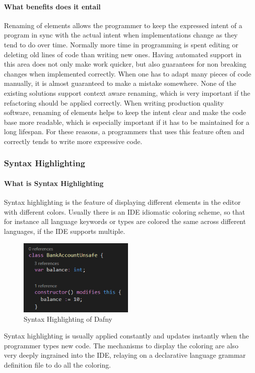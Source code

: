 \paragraph{What benefits does it entail}
Renaming of elements allows the programmer to keep the expressed intent of a program in sync with the actual intent when implementations change as they tend to do over time. Normally more time in programming is spent editing or deleting old lines of code than writing new ones. Having automated support in this area does not only make work quicker, but also guarantees for non breaking changes when implemented correctly. When one has to adapt many pieces of code manually, it is almost guaranteed to make a mistake somewhere. \newline
None of the existing solutions support context aware renaming, which is very important if the refactoring should be applied correctly. When writing production quality software, renaming of elements helps to keep the intent clear and make the code base more readable, which is especially important if it has to be maintained for a long lifespan. For these reasons, a programmers that uses this feature often and correctly tends to write more expressive code.
\subsubsection{Syntax Highlighting} \label{agsyntaxhighlighting}
\paragraph{What is Syntax Highlighting}
Syntax highlighting is the feature of displaying different elements in the editor with different colors. Usually there is an IDE idiomatic coloring scheme, so that for instance all language keywords or types are colored the same across different languages, if the IDE supports multiple. \newline
\begin{figure}[H]
	\centering
	\includegraphics[width=0.5\textwidth]{img/syntaxHighlighting}
	\caption{Syntax Highlighting of Dafny}
	\label{fig:agsyntaxHighlighting}
\end{figure}
Syntax highlighting is usually applied constantly and updates instantly when the programmer types new code. The mechanisms to display the coloring are also very deeply ingrained into the IDE, relaying on a declarative language grammar definition file to do all the coloring. 
